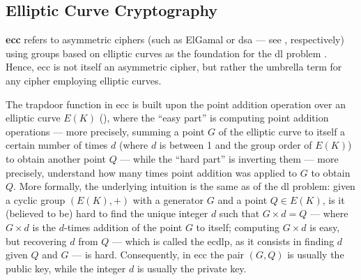\subsection{Elliptic Curve Cryptography}\label{sec:trapdoor_functions:elliptic_curve_cryptography}

\textbf{\gls{ecc}} refers to asymmetric ciphers (such as ElGamal or \gls{dsa} --- see , respectively) using groups based on elliptic curves as the foundation for the \gls{dl} problem \cite{koblitz_elliptic_1987,williams_use_1986}. Hence, \gls{ecc} is not itself an asymmetric cipher, but rather the umbrella term for any cipher employing elliptic curves.


The trapdoor function in \gls{ecc} is built upon the point addition operation over an elliptic curve $E(K)$ (), where the ``easy part'' is computing point addition operations --- more precisely, summing a point $G$ of the elliptic curve to itself a certain number of times $d$ (where $d$ is between 1 and the group order of $E(K)$) to obtain another point $Q$ --- while the ``hard part'' is inverting them --- more precisely, understand how many times point addition was applied to $G$ to obtain $Q$. More formally, the underlying intuition is the same as of the \gls{dl} problem: given a cyclic group $(E(K), +)$ with a generator $G$ and a point $Q \in E(K)$, is it (believed to be) hard to find the unique integer $d$ such that $G \times d = Q$ --- where $G \times d$ is the $d$-times addition of the point $G$ to itself; computing $G \times d$ is easy, but recovering $d$ from $Q$ --- which is called the \gls{ecdlp}, as it consists in finding $d$ given $Q$ and $G$ --- is hard. Consequently, in \gls{ecc} the pair $(G, Q)$ is usually the public key, while the integer $d$ is usually the private key.

